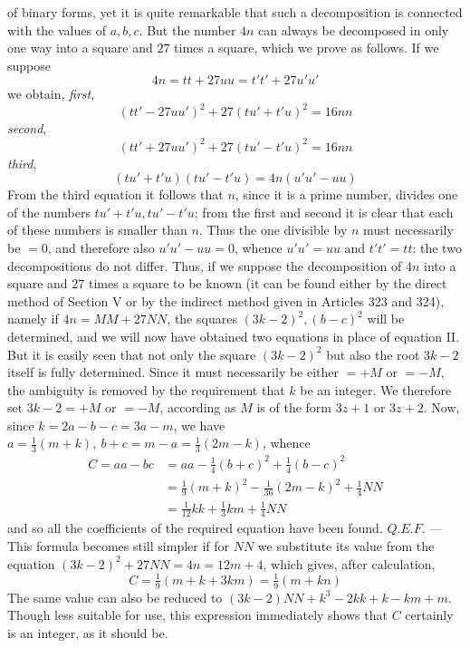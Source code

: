 of binary forms, yet it is quite remarkable that such a decomposition is connected with the values of \(a,\allowbreak b,\allowbreak c\). But the number \(4n\) can always be decomposed in only one way into a square and \(27\) times a square, which we prove as follows. If we suppose \[4n=tt+27uu=t't'+27u'u'\] we obtain, \textit{first}, \[(tt'-27uu')^2+27(tu'+t'u)^2=16nn\] \textit{second}, \[(tt'+27uu')^2+27(tu'-t'u)^2=16nn\] \textit{third}, \[(tu'+t'u)(tu'-t'u)=4n(u'u'-uu)\] From the third equation it follows that \(n\), since it is a prime number, divides one of the numbers \(tu'+t'u,\allowbreak tu'-t'u\); from the first and second it is clear that each of these numbers is smaller than \(n\). Thus the one divisible by \(n\) must necessarily be \(=0\), and therefore also \(u'u'-uu=0\), whence \(u'u'=uu\) and \(t't'=tt\): the two decompositions do not differ. Thus, if we suppose the decomposition of \(4n\) into a square and \(27\) times a square to be known (it can be found either by the direct method of Section V or by the indirect method given in Articles 323 and 324), namely if \(4n=MM+27NN\), the squares \((3k-2)^2,\allowbreak (b-c)^2\) will be determined, and we will now have obtained two equations in place of equation II. But it is easily seen that not only the square \((3k-2)^2\) but also the root \(3k-2\) itself is fully determined. Since it must necessarily be either \(=+M\) or \(=-M\), the ambiguity is removed by the requirement that \(k\) be an integer. We therefore set \(3k-2=+M\) or \(=-M\), according as \(M\) is of the form \(3z+1\) or \(3z+2\). Now, since \(k=2a-b-c=3a-m\), we have \(a=\frac13(m+k),\allowbreak \ b+c=m-a=\frac13(2m-k)\), whence \[\begin{aligned}C=aa-bc&=aa-\tfrac14(b+c)^2+\tfrac14(b-c)^2\\&=\tfrac19(m+k)^2-\tfrac1{36}(2m-k)^2+\tfrac14NN\\&=\tfrac1{12}kk+\tfrac13km+\tfrac14NN\end{aligned}\] and so all the coefficients of the required equation have been found. \(Q.E.F.\) — This formula
becomes still simpler if for \(NN\) we substitute its value from the equation \((3k-2)^2+27NN=4n=12m+4\), which gives, after calculation, \[C=\tfrac19(m+k+3km)=\tfrac19(m+kn)\] The same value can also be reduced to \((3k-2)NN+k^3-2kk+k-km+m\). Though less suitable for use, this expression immediately shows that \(C\) certainly is an integer, as it should be.

